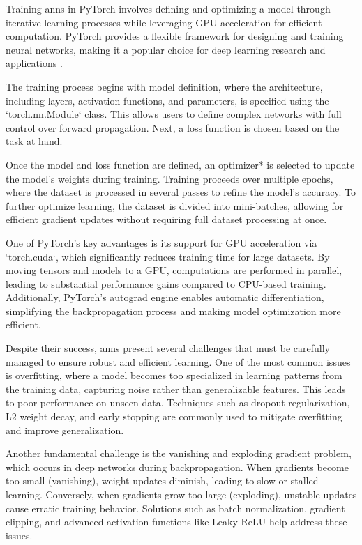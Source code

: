 Training \ac{ann}s in PyTorch involves defining and optimizing a model through iterative learning processes while leveraging GPU acceleration for efficient computation.
PyTorch provides a flexible framework for designing and training neural networks, making it a popular choice for deep learning research and applications \cite{paszke2019pytorch}.

The training process begins with model definition, where the architecture, including layers, activation functions, and parameters, is specified using the `torch.nn.Module` class.
This allows users to define complex networks with full control over forward propagation.
Next, a loss function is chosen based on the task at hand.

Once the model and loss function are defined, an optimizer* is selected to update the model’s weights during training.
Training proceeds over multiple epochs, where the dataset is processed in several passes to refine the model’s accuracy.
To further optimize learning, the dataset is divided into mini-batches, allowing for efficient gradient updates without requiring full dataset processing at once.

One of PyTorch’s key advantages is its support for GPU acceleration via `torch.cuda`, which significantly reduces training time for large datasets.
By moving tensors and models to a GPU, computations are performed in parallel, leading to substantial performance gains compared to CPU-based training.
Additionally, PyTorch's autograd engine enables automatic differentiation, simplifying the backpropagation process and making model optimization more efficient.

Despite their success, \ac{ann}s present several challenges that must be carefully managed to ensure robust and efficient learning.
One of the most common issues is overfitting, where a model becomes too specialized in learning patterns from the training data, capturing noise rather than generalizable features.
This leads to poor performance on unseen data.
Techniques such as dropout regularization, L2 weight decay, and early stopping are commonly used to mitigate overfitting and improve generalization.

Another fundamental challenge is the vanishing and exploding gradient problem, which occurs in deep networks during backpropagation.
When gradients become too small (vanishing), weight updates diminish, leading to slow or stalled learning.
Conversely, when gradients grow too large (exploding), unstable updates cause erratic training behavior.
Solutions such as batch normalization, gradient clipping, and advanced activation functions like Leaky ReLU help address these issues.

